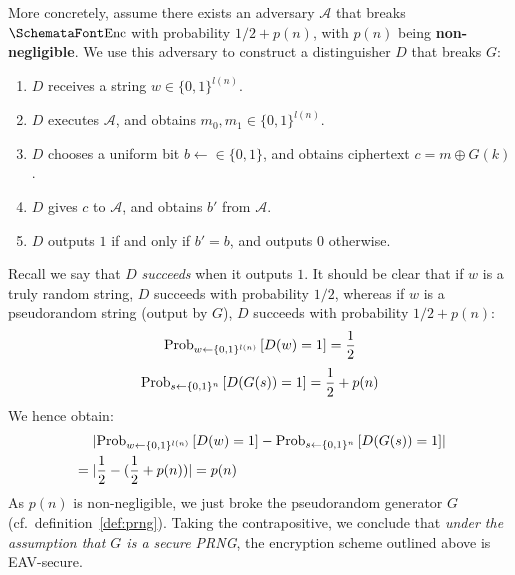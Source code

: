   More concretely, assume there exists an adversary $\mathcal{A}$ that breaks $\myemph{Enc}$ with probability $1/2 + p(n)$, with $p(n)$ being \textbf{non-negligible}. We use this adversary to construct a distinguisher $D$ that breaks $G$:
  \begin{enumerate}
    \item $D$ receives a string $w\in \{0, 1\}^{l(n)}$.
    \item $D$ executes $\mathcal{A}$, and obtains $m_0, m_1\in \{0, 1\}^{l(n)}$.
    \item $D$ chooses a uniform bit $b \leftarrow \in \{0, 1\}$, and obtains ciphertext $c = m \oplus G(k)$.
    \item $D$ gives $c$ to $\mathcal{A}$, and obtains $b'$ from $\mathcal{A}$.
    \item $D$ outputs $1$ if and only if $b' = b$, and outputs $0$ otherwise.
  \end{enumerate}
  Recall we say that $D$ \emph{succeeds} when it outputs $1$. It should be clear that if $w$ is a truly random string, $D$ succeeds with probability $1/2$, whereas if $w$ is a pseudorandom string (output by $G$), $D$ succeeds with probability $1/2 + p(n)$:
  \begin{equation}
    \textup{Prob}_{w \leftarrow \{0, 1\}^{l(n)}}\left[D(w) = 1\right] = \frac{1}{2}
  \end{equation}
  \begin{equation}
    \textup{Prob}_{s \leftarrow \{0, 1\}^{n}}\left[D(G(s)) = 1\right] = \frac{1}{2} + p(n)
  \end{equation}
  We hence obtain:
  \begin{align}
    &\phantom{{}={}}\abs{\textup{Prob}_{w \leftarrow \{0, 1\}^{l(n)}}\left[D(w) = 1\right] - \textup{Prob}_{s \leftarrow \{0, 1\}^{n}}\left[D(G(s)) = 1\right]} \\
    &= \abs{\frac{1}{2} - \parens{\frac{1}{2} + p(n)}} = p(n)
  \end{align}
  As $p(n)$ is non-negligible, we just broke the pseudorandom generator $G$ (cf.\ definition~\ref{def:prng}). Taking the contrapositive, we conclude that \emph{under the assumption that $G$ is a secure PRNG}, the encryption scheme outlined above is EAV-secure.

  \vspace{1em}

